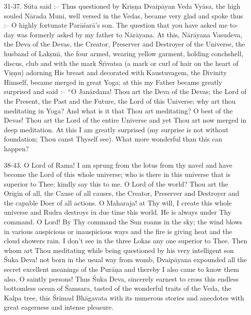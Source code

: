31-37. S\=uta said :-- Thus questioned by Kri\d{s}\d{n}a Dvaip\=ayan Veda Vy\=asa, the high souled N\=arada Muni, well versed in the Vedas, became very glad and spoke thus :-- O highly fortunate Par\=a\'sar\=a's son. The question that you have asked me to-day was formerly asked by my father to N\=ar\=ayana. At this, N\=ar\=ayana Vasudeva, the Deva of the Devas, the Creator, Preserver and Destroyer of the Universe, the husband of Lak\d{s}m\={\i}, the four armed, wearing yellow garment, holding conchshell, discus, club and with the mark \'Sr\={\i}vatsa (a mark or curl of hair on the heart of Vi\d{s}\d{n}u) adorning His breast and decorated with Kaustuvagem, the Divinity Himself, became merged in great Yoga; at this my Father became greatly surprised and said :-- ``O Jan\=ardana! Thou art the Deva of the Devas; the Lord of the Present, the Past and the Future, the Lord of this Universe; why art thou meditating in Yoga? And what is it that Thou art meditating? O best of the Devas! Thou art the Lord of the entire Universe and yet Thou art now merged in deep meditation. At this I am greatly surprised (my surprise is not without foundation; Thou canst Thyself see). What more wonderful than this can happen?

38-43. O Lord of Rama! I am sprung from the lotus from thy navel and have become the Lord of this whole universe; who is there in this universe that is superior to Thee; kindly say this to me. O Lord of the world? Thou art the Origin of all, the Cause of all causes, the Creator, Preserver and Destroyer and the capable Doer of all actions. O Maharaja! at Thy will, I create this whole universe and Rudra destroys iu due time this world. He is always under Thy command. O Lord! By Thy command the Sun roams in the sky; the wind blows in various auspicious or inauspicious ways and the fire is giving heat and the cloud showers rain. I don't see in the three Lokas any one superior to Thee. Then whom art Thou meditating while being questioned by his very intelligent son \'Suka Deva! not born in the usual way from womb, Dvaip\=ayana expounded all the secret excellent meanings of the Pur\=a\d{n}a and thereby I also came to know them also. O saintly persons! Thus \'Suka Deva, sincerely earnest to cross this endless bottomless ocean of \'Samsara, tasted of the wonderful traits of the Veda, the Kalpa tree, this \'Srimad Bh\=agavata with its numerous stories and anecdotes with great eagerness and intense pleasure.

